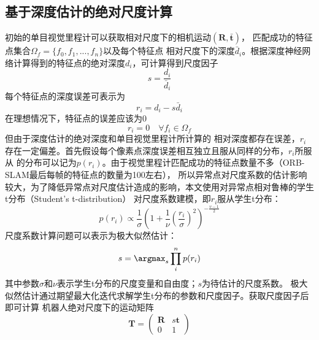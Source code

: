 \subsection{基于深度估计的绝对尺度计算}
初始的单目视觉里程计可以获取相对尺度下的相机运动$(\mathbf{R},\mathbf{\bar{t}})$，
匹配成功的特征点集合$\Omega_f=\{f_0,f_1,...,f_n\}$以及每个特征点
相对尺度下的深度$\bar{d}_i$。根据深度神经网络计算得到的特征点的绝对深度$d_i$，可计算得到尺度因子
\begin{equation}
    s = \frac{d_i}{\bar{d}_i}
\end{equation}
每个特征点的深度误差可表示为
\begin{equation}
    r_i = d_i- s \bar{d}_i
\end{equation}
在理想情况下，特征点的误差应该为0
\begin{equation}
    r_i=0\quad \forall f_i \in \Omega_f
\end{equation} 
但由于深度估计的绝对深度和单目视觉里程计所计算的
相对深度都存在误差，$r_i$存在一定偏差。首先假设每个像素点深度误差相互独立且服从同样的分布，$r_i$所服从
的分布可以记为$p(r_i)$。由于视觉里程计匹配成功的特征点数量不多（ORB-SLAM最后每帧的特征点的数量为100左右），
所以异常点对尺度系数的估计影响较大，为了降低异常点对尺度估计造成的影响，本文使用对异常点相对鲁棒的学生t分布（Student's t-distribution）
对尺度系数建模，即$r_i$服从学生t分布：
\begin{equation}
    p(r_i) \propto \frac{1}{\sigma}\left(1+\frac{1}{\nu}\left(\frac{r_i}{\sigma}\right)^2\right)^{-\frac{v-1}{2}}
\end{equation}
尺度系数计算问题可以表示为极大似然估计：
\begin{equation}
    s = \argmax_s \prod_i^n p(r_i)
    \label{eq:deepsr_scale}
\end{equation}
其中参数$\sigma$和$\nu$表示学生t分布的尺度变量和自由度；$s$为待估计的尺度系数。
极大似然估计通过期望最大化迭代求解学生t分布的参数和尺度因子\cite{lange1989robust}。获取尺度因子后即可计算
机器人绝对尺度下的运动矩阵
\begin{equation}
    \mathbf{T} = \begin{pmatrix}
        \mathbf{R} & s \mathbf{t}\\
        0&1
    \end{pmatrix}
\end{equation}

